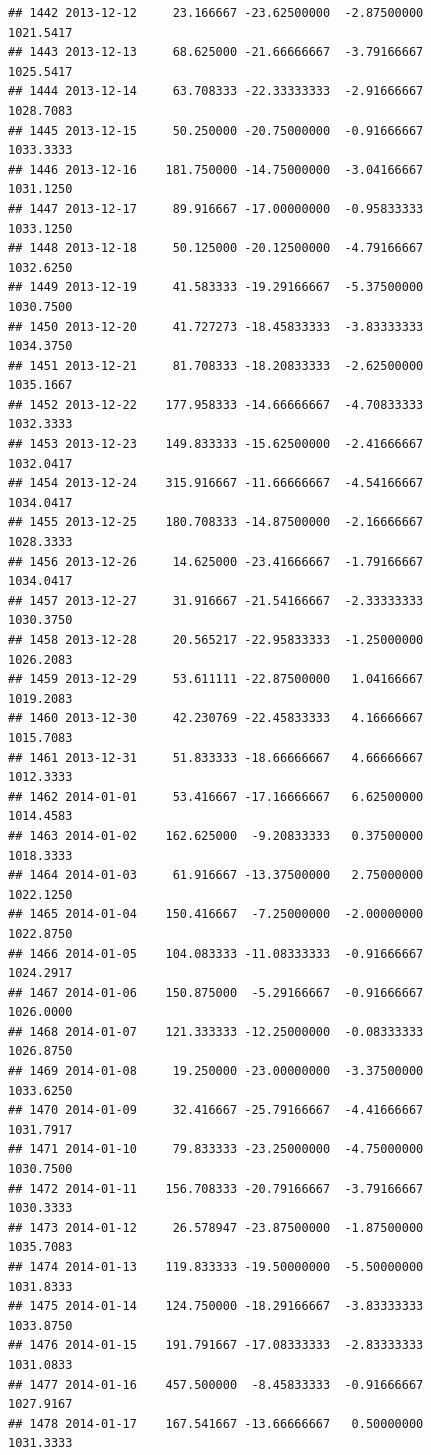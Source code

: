\documentclass[
]{article}
\begin{document}
\begin{verbatim}
## 1442 2013-12-12     23.166667 -23.62500000  -2.87500000    1021.5417
## 1443 2013-12-13     68.625000 -21.66666667  -3.79166667    1025.5417
## 1444 2013-12-14     63.708333 -22.33333333  -2.91666667    1028.7083
## 1445 2013-12-15     50.250000 -20.75000000  -0.91666667    1033.3333
## 1446 2013-12-16    181.750000 -14.75000000  -3.04166667    1031.1250
## 1447 2013-12-17     89.916667 -17.00000000  -0.95833333    1033.1250
## 1448 2013-12-18     50.125000 -20.12500000  -4.79166667    1032.6250
## 1449 2013-12-19     41.583333 -19.29166667  -5.37500000    1030.7500
## 1450 2013-12-20     41.727273 -18.45833333  -3.83333333    1034.3750
## 1451 2013-12-21     81.708333 -18.20833333  -2.62500000    1035.1667
## 1452 2013-12-22    177.958333 -14.66666667  -4.70833333    1032.3333
## 1453 2013-12-23    149.833333 -15.62500000  -2.41666667    1032.0417
## 1454 2013-12-24    315.916667 -11.66666667  -4.54166667    1034.0417
## 1455 2013-12-25    180.708333 -14.87500000  -2.16666667    1028.3333
## 1456 2013-12-26     14.625000 -23.41666667  -1.79166667    1034.0417
## 1457 2013-12-27     31.916667 -21.54166667  -2.33333333    1030.3750
## 1458 2013-12-28     20.565217 -22.95833333  -1.25000000    1026.2083
## 1459 2013-12-29     53.611111 -22.87500000   1.04166667    1019.2083
## 1460 2013-12-30     42.230769 -22.45833333   4.16666667    1015.7083
## 1461 2013-12-31     51.833333 -18.66666667   4.66666667    1012.3333
## 1462 2014-01-01     53.416667 -17.16666667   6.62500000    1014.4583
## 1463 2014-01-02    162.625000  -9.20833333   0.37500000    1018.3333
## 1464 2014-01-03     61.916667 -13.37500000   2.75000000    1022.1250
## 1465 2014-01-04    150.416667  -7.25000000  -2.00000000    1022.8750
## 1466 2014-01-05    104.083333 -11.08333333  -0.91666667    1024.2917
## 1467 2014-01-06    150.875000  -5.29166667  -0.91666667    1026.0000
## 1468 2014-01-07    121.333333 -12.25000000  -0.08333333    1026.8750
## 1469 2014-01-08     19.250000 -23.00000000  -3.37500000    1033.6250
## 1470 2014-01-09     32.416667 -25.79166667  -4.41666667    1031.7917
## 1471 2014-01-10     79.833333 -23.25000000  -4.75000000    1030.7500
## 1472 2014-01-11    156.708333 -20.79166667  -3.79166667    1030.3333
## 1473 2014-01-12     26.578947 -23.87500000  -1.87500000    1035.7083
## 1474 2014-01-13    119.833333 -19.50000000  -5.50000000    1031.8333
## 1475 2014-01-14    124.750000 -18.29166667  -3.83333333    1033.8750
## 1476 2014-01-15    191.791667 -17.08333333  -2.83333333    1031.0833
## 1477 2014-01-16    457.500000  -8.45833333  -0.91666667    1027.9167
## 1478 2014-01-17    167.541667 -13.66666667   0.50000000    1031.3333

\end{verbatim}
\end{document}
